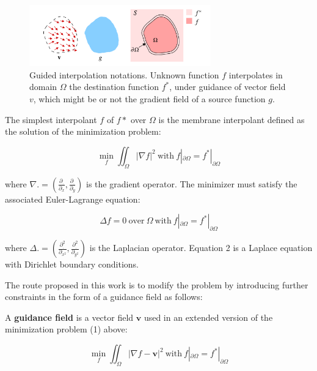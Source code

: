 \documentclass{article}
\begin{document}
\begin{figure}[h!]
    \centering
    \includegraphics[width=0.7\textwidth]{figure_1.png}
    \caption{Guided interpolation notations. Unknown function $f$ interpolates in domain $\Omega$ the destination function $f^*$, under guidance of vector field $v$, which might be or not the gradient field of a source function $g$.}
    \label{fig:guided_interpolation}
\end{figure}

The simplest interpolant $f$ of $f*$ over $\Omega$ is the membrane interpolant defined as the solution of the minimization problem:

\begin{equation}
    \min_f \iint_\Omega |\nabla f|^2 \ \text{with} \ f|_{\partial \Omega} = f^*|_{\partial \Omega}
\end{equation}


where $\nabla . = (\frac{\partial_.}{\partial_x}, \frac{\partial_.}{\partial_y})$ is the gradient operator. The minimizer must satisfy the associated Euler-Lagrange equation:

\begin{equation}
    \Delta f = 0 \ \text{over} \ \Omega \ \text{with} \ f|_{\partial \Omega} = f^*|_{\partial \Omega}
\end{equation}


where $\Delta . = (\frac{\partial^2_.}{\partial_{x^2}}, \frac{\partial^2_.}{\partial_{y^2}})$ is the Laplacian operator. Equation 2 is a Laplace equation with Dirichlet boundary conditions.

The route proposed in this work is to modify the problem by introducing further constraints in the form of a guidance field as follows:

A \textbf{guidance field} is a vector field $\mathbf{v}$ used in an extended version of the minimization problem (1) above:

\begin{equation}
    \min_f \iint_\Omega |\nabla f - \mathbf{v}|^2 \ \text{with} \ f|_{\partial \Omega} = f^*|_{\partial \Omega}
\end{equation}
\end{document}
